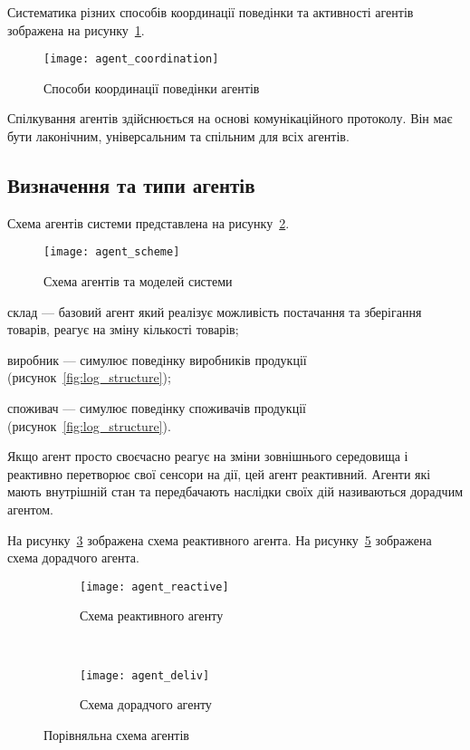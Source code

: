 Систематика різних способів координації поведінки та активності агентів зображена на рисунку~\ref{fig:agent_coordination}.

\begin{figure}[H]
	\centering
	\texttt{[image: agent\_coordination]}
	\caption{Способи координації поведінки агентів~\cite{GerhardWeiss1996}}
	\label{fig:agent_coordination}
\end{figure}

Спілкування агентів здійснюється на основі комунікаційного протоколу. Він має бути лаконічним, універсальним та спільним для всіх агентів.

\subsection{Визначення та типи агентів}
Схема агентів системи представлена на рисунку~\ref{fig:agent_scheme}.

\begin{figure}[H]
	\centering
	\texttt{[image: agent\_scheme]}
	\caption{Схема агентів та моделей системи}
	\label{fig:agent_scheme}
\end{figure}
\begin{description}
	\item[де] склад --- базовий агент який реалізує можливість постачання та зберігання товарів, реагує на зміну кількості товарів;
	\item виробник --- симулює поведінку виробників продукції (рисунок~\ref{fig:log_structure});
	\item споживач --- симулює поведінку споживачів продукції (рисунок~\ref{fig:log_structure}).
\end{description}

Якщо агент просто своєчасно реагує на зміни зовнішнього середовища і реактивно перетворює свої сенсори на дії, цей агент реактивний.
Агенти які мають внутрішній стан та передбачають наслідки своїх дій називаються дорадчим агентом.

На рисунку~\ref{fig:agent_reactive} зображена схема реактивного агента. 
На рисунку~\ref{fig:agent_deliv} зображена схема дорадчого агента.

\begin{figure}[H]
	\centering
	\begin{subfigure}[b]{0.49\textwidth}
		\texttt{[image: agent\_reactive]}
		\caption{Схема реактивного агенту}
		\label{fig:agent_reactive}
	\end{subfigure}
	~
	\begin{subfigure}[b]{0.49\textwidth}
		\texttt{[image: agent\_deliv]}
		\caption{Схема дорадчого агенту}
		\label{fig:agent_deliv}
	\end{subfigure}
    \caption{Порівняльна схема агентів}
\end{figure}

